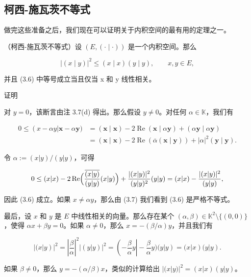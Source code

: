 \subsection*{柯西-施瓦茨不等式}

做完这些准备之后，我们现在可以证明关于内积空间的最有用的定理之一。

\begin{theorem}

（柯西-施瓦茨不等式）设 $ (E, (\cdot \mid \cdot)) $ 是一个内积空间。那么

\begin{equation}
\left|(x\mid y)\right|^{2}\leq(x\mid x)(y\mid y),\qquad x,y\in E,
\end{equation}

并且 (3.6) 中等号成立当且仅当 x 和 y 线性相关。

证明

\begin{items}
\item

对 $y = 0$，该断言由注 3.7(d) 得出。那么假设 $y \neq 0$。对任何 $\alpha \in \mathbb{K}$，我们有

\begin{equation}
\begin{aligned}
0\leq\left(x-\alpha y\right|\boldsymbol{x}-\alpha\boldsymbol{y})&=\left(\boldsymbol{x}\mid\boldsymbol{x}\right)-2\operatorname{Re}(\boldsymbol{x}\mid\alpha\boldsymbol{y})+\left(\alpha\boldsymbol{y}\mid\alpha\boldsymbol{y}\right)\\&=\left(\boldsymbol{x}\mid\boldsymbol{x}\right)-2\operatorname{Re}\left(\overline{\alpha}(\boldsymbol{x}\mid\boldsymbol{y})\right)+\left|\alpha\right|^{2}\left(\boldsymbol{y}\mid\boldsymbol{y}\right).
\end{aligned}
\end{equation}

令 $ \alpha := (x|y)/(y|y) $，可得

\[
0\leq(x|x)-2\operatorname{R e}\Bigl(\frac{\overline{{(x|y)}}}{(y|y)}(x|y)\Bigr)+\frac{|(x|y)|^{2}}{(y|y)^{2}}(y|y)=(x|x)-\frac{|(x|y)|^{2}}{(y|y)},
\]

因此 (3.6) 成立。如果 $ x \neq \alpha y $，那么由 (3.7) 我们看到 (3.6) 是严格不等式。

\item

最后，设 $x$ 和 $y$ 是 $E$ 中线性相关的向量。那么存在某个 $(\alpha, \beta) \in \mathbb{K}^2 \setminus \{(0,0)\}$，使得 $\alpha x + \beta y = 0$。如果 $\alpha \neq 0$，那么 $x = -(\beta/\alpha)y$，并且我们有

\[
\left|(x\left|y\right)\right|^{2}=\left|\frac{\beta}{\alpha}\right|^{2}\left|\left(y\right|y\right)|^{2}=\left(-\frac{\beta}{\alpha}y\right|-\frac{\beta}{\alpha}y\Big)(y\left|y\right)=(x\left|x\right)(y\left|y\right).
\]

如果 $ \beta \neq 0 $，那么 $ y = -(\alpha / \beta)x $，类似的计算给出 $ |(x | y)|^2 = (x | x)(y | y) $。

\end{items}

\end{theorem}

